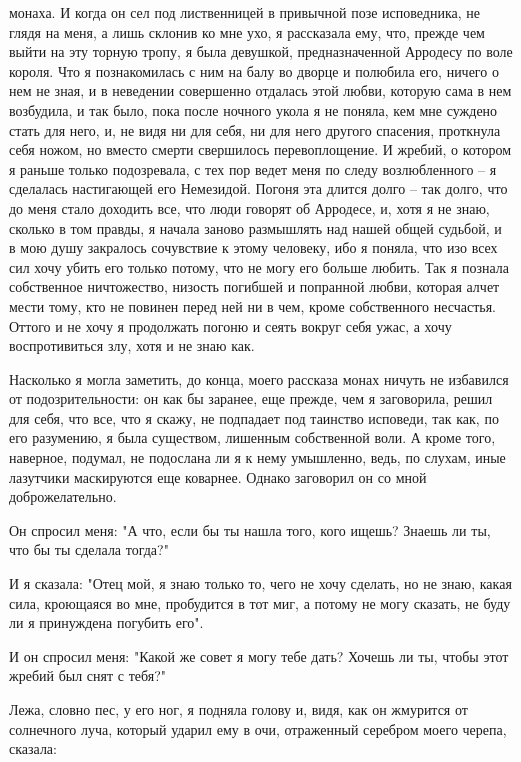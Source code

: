 монаха. И когда он сел под лиственницей в  привычной  позе  исповедника,  не
глядя  на меня, а лишь склонив ко мне ухо, я рассказала ему, что, прежде чем
выйти на эту торную тропу, я была девушкой, предназначенной Арродесу по воле
короля. Что я познакомилась с ним на балу во дворце и полюбила его, ничего о
нем не зная, и в неведении совершенно отдалась этой любви,  которую  сама  в
нем  возбудила,  и  так  было, пока после ночного укола я не поняла, кем мне
суждено стать для него, и,  не  видя  ни  для  себя,  ни  для  него  другого
спасения,  проткнула себя ножом, но вместо смерти свершилось перевоплощение.
И жребий, о котором я раньше только подозревала, с тех  пор  ведет  меня  по
следу  возлюбленного  --  я  сделалась настигающей его Немезидой. Погоня эта
длится долго -- так долго, что до меня стало доходить все, что люди  говорят
об  Арродесе,  и,  хотя  я  не  знаю,  сколько в том правды, я начала заново
размышлять над нашей общей судьбой, и в  мою  душу  закралось  сочувствие  к
этому человеку, ибо я поняла, что изо всех сил хочу убить его только потому,
что  не  могу  его  больше  любить.  Так  я познала собственное ничтожество,
низость погибшей и попранной любви, которая алчет мести тому, кто не повинен
перед ней ни в чем,  кроме  собственного  несчастья.  Оттого  и  не  хочу  я
продолжать  погоню и сеять вокруг себя ужас, а хочу воспротивиться злу, хотя
и не знаю как.

Насколько  я  могла заметить,  до  конца,  моего  рассказа монах  ничуть  не
избавился  от  подозрительности:  он  как  бы заранее,  еще  прежде,  чем  я
заговорила, решил для себя, что все,  что я скажу, не подпадает под таинство
исповеди, так как, по его  разумению, я была существом, лишенным собственной
воли. А кроме  того, наверное, подумал, не подослана ли  я к нему умышленно,
ведь, по слухам,  иные лазутчики маскируются еще  коварнее. Однако заговорил
он со мной доброжелательно.

Он спросил меня: "А что, если бы ты нашла того, кого ищешь?  Знаешь  ли
ты, что бы ты сделала тогда?"

И  я  сказала: "Отец мой, я знаю только то, чего не хочу сделать, но не
знаю, какая сила, кроющаяся во мне, пробудится в тот миг, а потому  не  могу
сказать, не буду ли я принуждена погубить его".

И  он  спросил  меня:  "Какой  же совет я могу тебе дать? Хочешь ли ты,
чтобы этот жребий был снят с тебя?"

Лежа, словно пес, у его ног, я подняла голову и, видя, как он  жмурится
от  солнечного  луча,  который  ударил  ему в очи, отраженный серебром моего
черепа, сказала:


